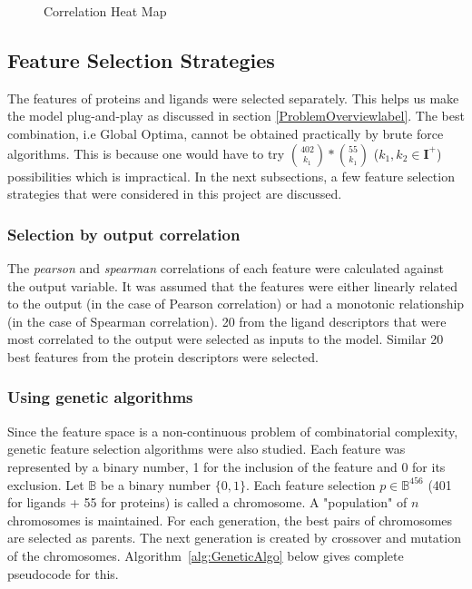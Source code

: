 \documentclass[11pt]{article}
\begin{document}
\begin{figure}[htb]
\begin{subfigure}[b]{0.45\textwidth}
        \label{fig:correlationfr}
     \end{subfigure}
     \caption{Correlation Heat Map}
     \label{fig:correlationheatmap}
\end{figure}

\subsection{Feature Selection Strategies}


The features of proteins and ligands were selected separately.
This helps us make the model plug-and-play as discussed in section \ref{ProblemOverviewlabel}.
The best combination,  i.e Global Optima,  cannot be obtained practically by brute force algorithms.
This is because one would have to try $\binom{402}{k_1} * \binom{55}{k_1}$ ($k_1, k_2 \in \mathbf{I}^+$) possibilities which is impractical.
In the next subsections, a few feature selection strategies that were considered in this project are discussed.

\subsubsection{Selection by output correlation}
The \textit{pearson} and \textit{spearman} correlations of each feature were calculated against the output variable.
It was assumed that the features were either linearly related to the output (in the case of Pearson correlation) or had a monotonic relationship (in the case of Spearman correlation).
20 from the ligand descriptors that were most correlated to the output were selected as inputs to the model.  Similar 20 best features from the protein descriptors were selected.

\subsubsection{Using genetic algorithms}
Since the feature space is a non-continuous problem of combinatorial complexity,
genetic feature selection algorithms \cite{genetic_algorithm} were also studied.
Each feature was represented by a binary number, 1 for the inclusion of the feature and 0 for its exclusion.
Let $\mathbb{B}$ be a binary number $\{0,  1\}$.
Each feature selection $p \in \mathbb{B}^{456}$ (401 for ligands + 55 for proteins) is called a chromosome.
A "population" of $n$ chromosomes is maintained.
For each generation,  the best pairs of chromosomes are selected as parents.
The next generation is created by crossover and mutation of the chromosomes.
Algorithm~\ref{alg:GeneticAlgo} below gives complete pseudocode for this.
\end{document}
